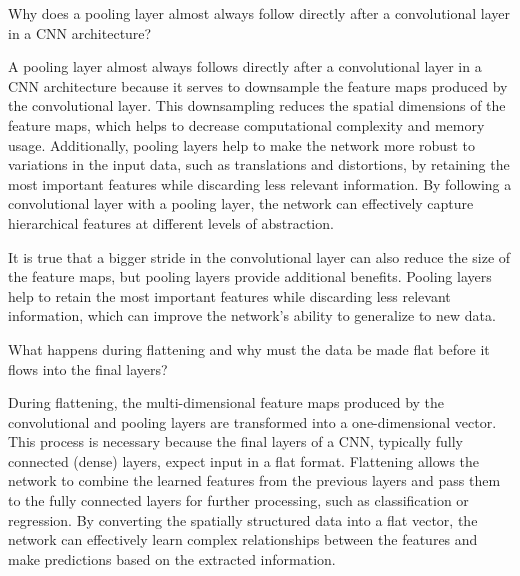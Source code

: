 \begin{ejercicio}
    Why does a pooling layer almost always follow directly after a convolutional layer in a CNN architecture?

    A pooling layer almost always follows directly after a convolutional layer in a CNN architecture because it serves to downsample the feature maps produced by the convolutional layer. This downsampling reduces the spatial dimensions of the feature maps, which helps to decrease computational complexity and memory usage. Additionally, pooling layers help to make the network more robust to variations in the input data, such as translations and distortions, by retaining the most important features while discarding less relevant information. By following a convolutional layer with a pooling layer, the network can effectively capture hierarchical features at different levels of abstraction.
    \begin{observacion}
        It is true that a bigger stride in the convolutional layer can also reduce the size of the feature maps, but pooling layers provide additional benefits. Pooling layers help to retain the most important features while discarding less relevant information, which can improve the network's ability to generalize to new data.
    \end{observacion}
\end{ejercicio}

\begin{ejercicio}[Flattening]
    What happens during flattening and why must the data be made flat before it flows into the final layers?

    During flattening, the multi-dimensional feature maps produced by the convolutional and pooling layers are transformed into a one-dimensional vector. This process is necessary because the final layers of a CNN, typically fully connected (dense) layers, expect input in a flat format. Flattening allows the network to combine the learned features from the previous layers and pass them to the fully connected layers for further processing, such as classification or regression. By converting the spatially structured data into a flat vector, the network can effectively learn complex relationships between the features and make predictions based on the extracted information.
\end{ejercicio}

